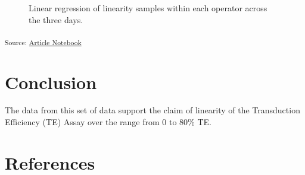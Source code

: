 \documentclass[
]{agujournal2019}
\begin{document}
\label{cell-fig-regression}
\begin{figure}[H]


\caption{\label{fig-regression}Linear regression of linearity samples
within each operator across the three days.}

\end{figure}%

\textsubscript{Source:
\href{https://jinkaiteo.github.io/quarto-template/index.qmd.html}{Article
Notebook}}

\section{Conclusion}\label{conclusion}

The data from this set of data support the claim of linearity of the
Transduction Efficiency (TE) Assay over the range from 0 to 80\% TE.

\section*{References}\label{references}
\end{document}
